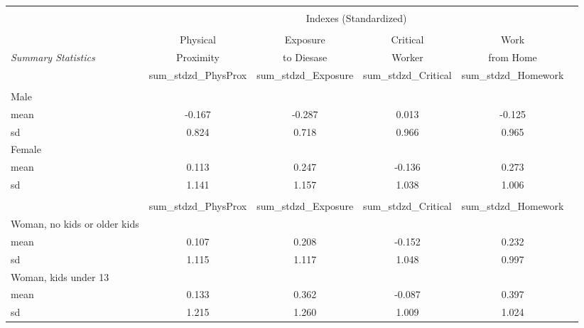 \begin{tabular*}{\hsize}{ @{\extracolsep{\fill}}l*{5}{c}}
\hline\hline
\\
 &\multicolumn{4}{c}{Indexes (Standardized)} \\
\cline{2-5} \\
&\multicolumn{1}{c}{Physical} &\multicolumn{1}{c}{Exposure} &\multicolumn{1}{c}{Critical} &\multicolumn{1}{c}{Work} \\
\textit{Summary Statistics} &\multicolumn{1}{c}{Proximity} &\multicolumn{1}{c}{to Diesase} &\multicolumn{1}{c}{Worker} &\multicolumn{1}{c}{from Home} \\
                                                  &sum\_stdzd\_PhysProx&sum\_stdzd\_Exposure&sum\_stdzd\_Critical&sum\_stdzd\_Homework\\
\hline
\\
\hspace{0.25cm}Male                                              &    &    &    &    \\
mean                                              &-0.167&-0.287&0.013&-0.125\\
sd                                                &0.824&0.718&0.966&0.965\\
\hspace{0.25cm}Female                                            &    &    &    &    \\
mean                                              &0.113&0.247&-0.136&0.273\\
sd                                                &1.141&1.157&1.038&1.006\\

\\

                                                  &sum\_stdzd\_PhysProx&sum\_stdzd\_Exposure&sum\_stdzd\_Critical&sum\_stdzd\_Homework\\

\hspace{0.25cm}Woman, no kids or older kids                      &    &    &    &    \\
mean                                              &0.107&0.208&-0.152&0.232\\
sd                                                &1.115&1.117&1.048&0.997\\
\hspace{0.25cm}Woman, kids under 13                              &    &    &    &    \\
mean                                              &0.133&0.362&-0.087&0.397\\
sd                                                &1.215&1.260&1.009&1.024\\


\end{tabular*}
